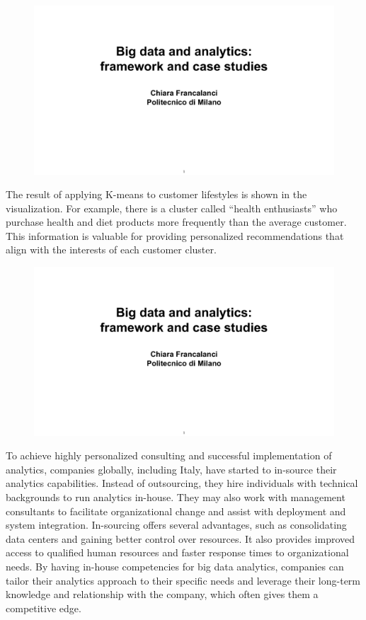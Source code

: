 \begin{figure}[!h]
    \centering
    \includegraphics[page=73, trim = 1cm 1.5cm 2.5cm 3cm, clip, width=\textwidth]{images/06 - BIG_DATA.pdf}
\end{figure}

The result of applying K-means to customer lifestyles is shown in the
visualization. For example, there is a cluster called ``health
enthusiasts'' who purchase health and diet products more frequently than
the average customer. This information is valuable for providing
personalized recommendations that align with the interests of each
customer cluster.

\begin{figure}[!h]
    \centering
    \includegraphics[page=74, trim = 1cm 1.5cm 1.5cm 1cm, clip, width=\textwidth]{images/06 - BIG_DATA.pdf}
\end{figure}

To achieve highly personalized consulting and successful implementation
of analytics, companies globally, including Italy, have started to
in-source their analytics capabilities. Instead of outsourcing, they
hire individuals with technical backgrounds to run analytics in-house.
They may also work with management consultants to facilitate
organizational change and assist with deployment and system integration.
In-sourcing offers several advantages, such as consolidating data
centers and gaining better control over resources. It also provides
improved access to qualified human resources and faster response times
to organizational needs. By having in-house competencies for big data
analytics, companies can tailor their analytics approach to their
specific needs and leverage their long-term knowledge and relationship
with the company, which often gives them a competitive edge.


